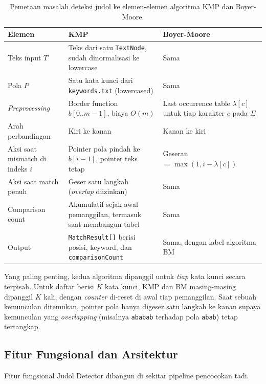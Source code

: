 \documentclass[11pt,a4paper]{article}
\begin{document}
\begin{table}[H]
    \centering
    \caption{Pemetaan masalah deteksi judol ke elemen-elemen algoritma KMP dan Boyer-Moore.}
    \label{tab:kmp-bm-mapping}
    \begin{tabularx}{\textwidth}{p{3.6cm}|X|X}
        \toprule
        \textbf{Elemen} & \textbf{KMP} & \textbf{Boyer-Moore} \\
        \midrule
        Teks input $T$ & Teks dari satu \texttt{TextNode}, sudah dinormalisasi ke lowercase & Sama \\
        Pola $P$ & Satu kata kunci dari \texttt{keywords.txt} (lowercased) & Sama \\
        \textit{Preprocessing} & Border function $b[0..m-1]$, biaya $O(m)$ & Last occurrence table $\lambda[c]$ untuk tiap
        karakter $c$ pada $\Sigma$ \\
        Arah perbandingan & Kiri ke kanan & Kanan ke kiri \\
        Aksi saat mismatch di indeks $i$ & Pointer pola pindah ke $b[i-1]$, pointer teks tetap & Geseran
        $= \max(1, i - \lambda[c])$ \\
        Aksi saat match penuh & Geser satu langkah (\textit{overlap} diizinkan) & Sama \\
        Comparison count & Akumulatif sejak awal pemanggilan, termasuk saat membangun tabel & Sama \\
        Output & \texttt{MatchResult[]} berisi posisi, keyword, dan \texttt{comparisonCount} & Sama, dengan label algoritma BM \\
        \bottomrule
    \end{tabularx}
\end{table}

Yang paling penting, kedua algoritma dipanggil untuk \textit{tiap} kata kunci secara terpisah. Untuk daftar berisi $K$ kata
kunci, KMP dan BM masing-masing dipanggil $K$ kali, dengan \textit{counter} di-reset di awal tiap pemanggilan. Saat sebuah
kemunculan ditemukan, pointer pola hanya digeser satu langkah ke kanan supaya kemunculan yang \textit{overlapping} (misalnya
\texttt{ababab} terhadap pola \texttt{abab}) tetap tertangkap.

\subsection{Fitur Fungsional dan Arsitektur}

Fitur fungsional Judol Detector dibangun di sekitar pipeline pencocokan tadi.
\end{document}
